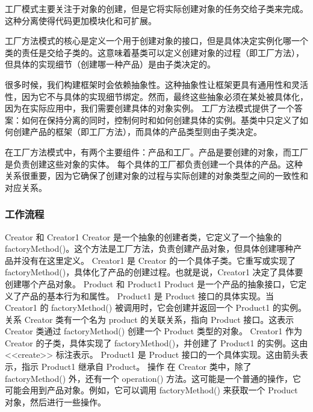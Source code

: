 工厂模式主要关注于对象的创建，但是它将实际创建对象的任务交给子类来完成。这种分离使得代码更加模块化和可扩展。

工厂方法模式的核心是定义一个用于创建对象的接口，但是具体决定实例化哪一个类的责任是交给子类的。这意味着基类可以定义创建对象的过程（即工厂方法），但具体的实现细节（创建哪一种产品）是由子类决定的。

很多时候，我们构建框架时会依赖抽象性。这种抽象性让框架更具有通用性和灵活性，因为它不与具体的实现细节绑定。然而，最终这些抽象必须在某处被具体化，因为在实际应用中，我们需要创建具体的对象实例。
工厂方法模式提供了一个答案：如何在保持分离的同时，控制何时和如何创建具体的实例。基类中只定义了如何创建产品的框架（即工厂方法），而具体的产品类型则由子类决定。

在工厂方法模式中，有两个主要组件：产品和工厂。产品是要创建的对象，而工厂是负责创建这些对象的实体。
每个具体的工厂都负责创建一个具体的产品。这种关系很重要，因为它确保了创建对象的过程与实际创建的对象类型之间的一致性和对应关系。

\subsubsection{工作流程}
Creator 和 Creator1
Creator 是一个抽象的创建者类，它定义了一个抽象的 factoryMethod()。这个方法是工厂方法，负责创建产品对象，但具体创建哪种产品并没有在这里定义。
Creator1 是 Creator 的一个具体子类。它重写或实现了 factoryMethod()，具体化了产品的创建过程。也就是说，Creator1 决定了具体要创建哪个产品对象。
Product 和 Product1
Product 是一个产品的抽象接口，它定义了产品的基本行为和属性。
Product1 是 Product 接口的具体实现。当 Creator1 的 factoryMethod() 被调用时，它会创建并返回一个 Product1 的实例。
关系
Creator 类有一个名为 product 的关联关系，指向 Product 接口。这表示 Creator 类通过 factoryMethod() 创建一个 Product 类型的对象。
Creator1 作为 Creator 的子类，具体实现了 factoryMethod()，并创建了 Product1 的实例。这由 <<create>> 标注表示。
Product1 是 Product 接口的一个具体实现。这由箭头表示，指示 Product1 继承自 Product。
操作
在 Creator 类中，除了 factoryMethod() 外，还有一个 operation() 方法。这可能是一个普通的操作，它可能会用到产品对象。例如，它可以调用 factoryMethod() 来获取一个 Product 对象，然后进行一些操作。




































